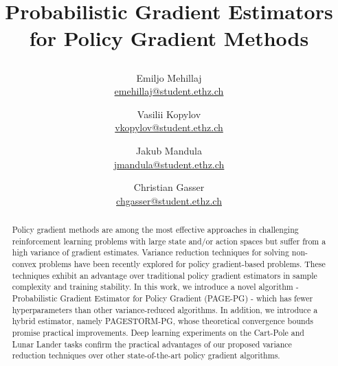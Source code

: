 \documentclass[10pt,twocolumn,letterpaper]{article}
\title{
		    Probabilistic Gradient Estimators for Policy Gradient Methods
    		\author{
    		\small Emiljo Mehillaj \\ \small\url{emehillaj@student.ethz.ch} \and  %
    		\small Vasilii Kopylov  \\ \small\url{vkopylov@student.ethz.ch} \and  %
    		\small Jakub Mandula \\ \small\url{jmandula@student.ethz.ch} \and
    		\small Christian Gasser \\ \small\url{chgasser@student.ethz.ch}   %
            }
            
}
\date{}
\begin{document}
\maketitle
{}

\begin{abstract}
Policy gradient methods are among the most effective approaches in challenging reinforcement learning problems with large state and/or action spaces but suffer from a high variance of gradient estimates. Variance reduction techniques for solving non-convex problems have been recently explored for policy gradient-based problems. These techniques exhibit an advantage over traditional policy gradient estimators in sample complexity and training stability. In this work, we introduce a novel algorithm - Probabilistic Gradient Estimator for Policy Gradient (PAGE-PG) - which has fewer hyperparameters than other variance-reduced algorithms. In addition, we introduce a hybrid estimator, namely PAGESTORM-PG, whose theoretical convergence bounds promise practical improvements. Deep learning experiments on the Cart-Pole and Lunar Lander tasks confirm the practical advantages of our proposed variance reduction techniques over other state-of-the-art policy gradient algorithms.
\end{abstract}

\end{document}
